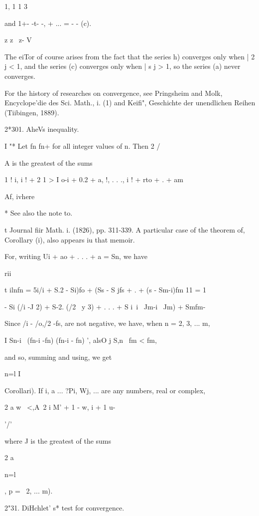 1, 1 1 3

and 1+- -t- -, + ... = - - (c).

z z~ z- V

The eiTor of course arises from the fact that the series h) converges
only when | 2 j < 1, and the series (c) converges only when | s j > 1,
so the series (a) never converges.

For the history of researches on convergence, see Pringsheim and Molk,
Encyclope'die des Sci. Math., i. (1) and Keifi", Geschichte der
unendlichen Reihen (Tiibingen, 1889).

2*301. AheVs inequality.

I "* Let fn fn+ for all integer values of n. Then 2 /

A is the greatest of the sums

1 ! i, i ! + 2 1 > I o-i + 0.2 + a, !, . . ., i ! + rto +   . + am

  Af, ivhere

* See also the note to.

t Journal fiir Math. i. (1826), pp. 311-339. A particular case of the
theorem of, Corollary (i), also appears iu that memoir.

%
%

For, writing Ui + ao + . . . + a = Sn, we have

rii

t ilnfn = 5i/i + S.2 - Si)fo + (Ss - S jfs + . + (s - Sm-i)fm 11 = 1

- Si (/i -J 2) + S-2. (/2 ~y 3) + . . . + S i\ i \ Jm-i ~Jm) + Smfm-

Since /i - /o,/2 -fs,  are not negative, we have, when n = 2, 3,
... m,

I Sn-i \ (fn-i -fn) (fn-i - fn) ', alsO j S,n \ fm < fm,

and so, summing and using, we get

n=l I

Corollari). If i, a ... ?Pi, Wj, ... are any numbers, real or complex,

2 a w \ <,A\ 2 i M' + 1 - w, i + 1 u-

'/'

where J is the greatest of the sums

2 a

n=l

, p = \, 2, ... m).


2"31. DiHchlet' s* test for convergence.

